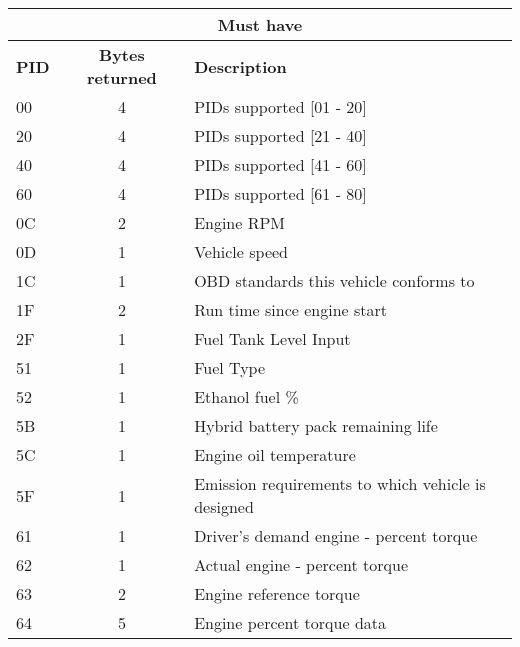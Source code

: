 \begin{longtable}{|l|c|l|}
    \hline
    \multicolumn{3}{|c|}{\textbf{Must have}}                                \\ \hline
    \textbf{PID} & \textbf{Bytes returned} & \textbf{Description}           \\ \hline
    00 & 4  & PIDs supported [01 - 20]                                      \\ \hline
    20 & 4  & PIDs supported [21 - 40]                                      \\ \hline
    40 & 4  & PIDs supported [41 - 60]                                      \\ \hline
    60 & 4  & PIDs supported [61 - 80]                                      \\ \hline
    0C & 2  & Engine RPM                                                    \\ \hline
    0D & 1  & Vehicle speed                                                 \\ \hline
    1C & 1  & OBD standards this vehicle conforms to                        \\ \hline
    1F & 2  & Run time since engine start                                   \\ \hline
    2F & 1  & Fuel Tank Level Input                                         \\ \hline
    51 & 1  & Fuel Type                                                     \\ \hline
    52 & 1  & Ethanol fuel \%                                               \\ \hline
    5B & 1  & Hybrid battery pack remaining life                            \\ \hline
    5C & 1  & Engine oil temperature                                        \\ \hline
    5F & 1  & Emission requirements to which vehicle is designed            \\ \hline
    61 & 1  & Driver's demand engine - percent torque                       \\ \hline
    62 & 1  & Actual engine - percent torque                                \\ \hline
    63 & 2  & Engine reference torque                                       \\ \hline
    64 & 5  & Engine percent torque data                                    \\ \hline

\end{longtable}

